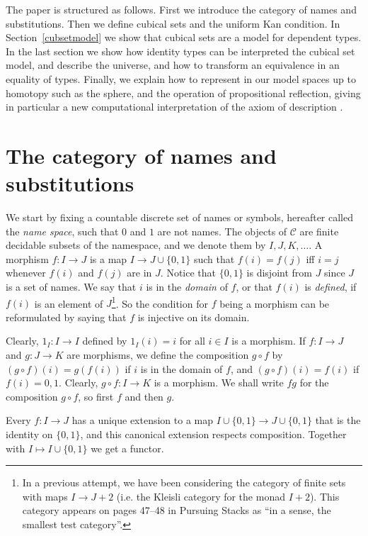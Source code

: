 \documentclass[10pt,a4paper]{article}
\newcommand{\CC}{{\mathcal C}}
\newcommand{\set}[1]{\{#1\}}
\begin{document}
 The paper is structured as follows. First we introduce the category of names and substitutions.
Then we define cubical sets and the uniform Kan condition.
In Section~\ref{cubsetmodel} we show that cubical sets are a model for dependent types.
In the last section we show how identity types can be interpreted the cubical set model,
and describe the universe, and how to transform an equivalence in an equality of types.
Finally, we explain how to represent in our model spaces up to homotopy such as the sphere,
and the operation of propositional reflection, giving in particular a new computational interpretation
of the axiom of description \cite{Russell}.

\section{The category of names and substitutions}

 We start by fixing a countable discrete set of names or symbols, hereafter called the \emph{name space},
such that $0$ and $1$ are not names.
The objects of $\CC$ are finite decidable subsets of the namespace,
and we denote them by $I,J,K,\dots$.
A morphism $f:I\to J$ is a map $I \to J\cup \set{0,1}$ such that $f(i) = f(j)$ iff $i=j$ whenever
$f(i)$ and $f(j)$ are in $J$. Notice that $\set{0,1}$ is disjoint from $J$ since $J$ is a set of
names. We say that $i$ is in the \emph{domain} of $f$, or that $f(i)$ is \emph{defined},
if $f(i)$ is an element of $J$\footnote%
{In a previous attempt, we have been considering the category of finite sets
with maps $I \to J+2$ (i.e. the Kleisli category for the monad $I+2$).
This category appears on pages 47--48 in Pursuing Stacks
\cite{Grothendieck} as ``in a sense, the smallest test category''.}.
So the condition for $f$ being a morphism can be reformulated by saying that $f$ is injective on its domain.

Clearly, $1_I : I\to I$ defined by $1_I(i) = i$ for all $i\in I$ is a morphism.
If $f:I\to J$ and $g:J\to K$ are morphisms, we define the composition $g\circ f$ by
$(g\circ f)(i) = g(f(i))$ if $i$ is in the domain of $f$, and $(g\circ f)(i) = f(i)$ if $f(i)= 0,1$.
Clearly, $g\circ f: I\to K$ is a morphism.
We shall write $fg$ for the composition $g\circ f$, so first $f$ and then $g$.

Every $f:I\to J$ has a unique extension to a map $I \cup \set{0,1} \to J\cup \set{0,1}$
that is the identity on $\set{0,1}$, and this canonical extension respects composition.
Together with $I\mapsto I \cup \set{0,1}$ we get a functor.%
\end{document}
